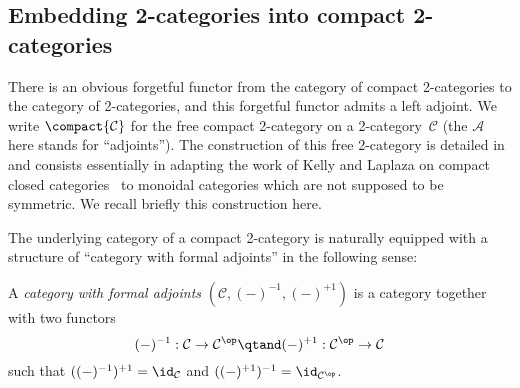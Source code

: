 \documentclass{LMCS}
\newenvironment{definition}{\begin{defi}}{\end{defi}}
\renewcommand{\C}{\mathcal{C}}
\begin{document}
\subsection{Embedding 2-categories into compact 2-categories}
\label{sec:compact-embedding}
There is an obvious forgetful functor from the category of compact 2-categories
to the category of 2-categories, and this forgetful functor admits a left
adjoint. We write $\compact{\C}$ for the free compact 2-category on a
2-category~$\C$ (the $\mathcal{A}$ here stands for ``adjoints''). The
construction of this free 2-category is detailed
in~\cite{preller-lambek:free-compact} and consists essentially in adapting the
work of Kelly and Laplaza on compact closed
categories~\cite{kelly-laplaza:coherence-compact-closed} to monoidal categories
which are not supposed to be symmetric. We recall briefly this construction
here.

The underlying category of a compact 2-category is naturally equipped with a
structure of ``category with formal adjoints'' in the following sense:

\begin{definition}
  A \emph{category with formal adjoints} $(\C,(-)^{-1},(-)^{+1})$ is a category
  together with two functors
  \[
  (-)^{-1}:\C\to\C^\op
  \qtand
  (-)^{+1}:\C^\op\to\C
  \]
  such that $((-)^{-1})^{+1}=\id_\C$ and $((-)^{+1})^{-1}=\id_{\C^\op}$.
\end{definition}
\end{document}
